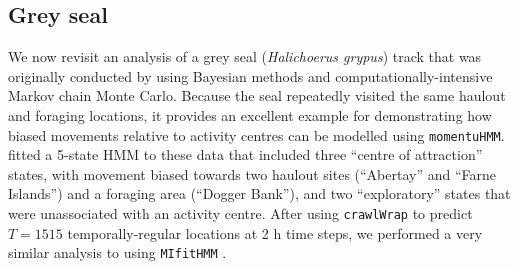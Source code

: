 \documentclass[12pt]{article}\usepackage[]{graphicx}\usepackage[]{color}
\begin{document}
\subsection{Grey seal}
\label{sec:greySeal}
We now revisit an analysis of a grey seal ({\it Halichoerus grypus}) track that was originally conducted by \cite{McClintockEtAl2012} using Bayesian methods and computationally-intensive Markov chain Monte Carlo. %
Because the seal repeatedly visited the same haulout and foraging locations, it provides an excellent example for demonstrating how biased movements relative to activity centres can be modelled using \verb|momentuHMM|. \cite{McClintockEtAl2012} fitted a 5-state HMM to these data that included three ``centre of attraction'' states, with movement biased towards two haulout sites (``Abertay'' and ``Farne Islands'') and a foraging area (``Dogger Bank''), and two ``exploratory'' states %
that were unassociated with an activity centre. After using \verb|crawlWrap| to predict $T=1515$ temporally-regular locations at 2 h time steps, we performed a very similar analysis to \cite{McClintockEtAl2012} using \verb|MIfitHMM| %
.
\end{document}
